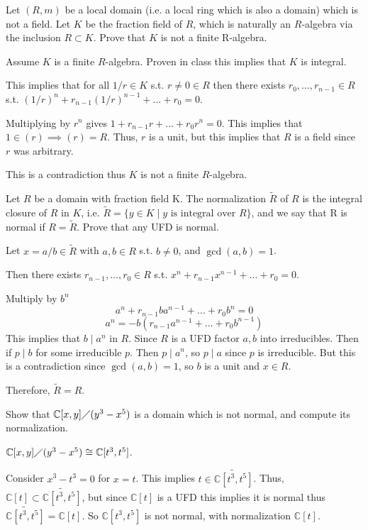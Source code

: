 \documentclass[12pt, letterpaper]{article}
\newcommand{\C}{\mathbb{C}}
\renewcommand{\t}[1]{\text{#1}}
\begin{document}

\begin{problem}{}
    Let $(R, m)$ be a local domain (i.e. a local ring which is also a domain) which is not a field.
Let $K$ be the fraction field of $R$, which is naturally an $R$-algebra via the inclusion $R \subset K$.
Prove that $K$ is not a finite R-algebra.
\end{problem}
\begin{problemproof}
    Assume $K$ is a finite $R$-algebra. Proven in class this implies that $K$ is integral.

    This implies that for all $1/r \in K$ s.t. $r \neq 0\in R$ then there exists $r_0,\dots,r_{n-1} \in R$ s.t. $(1/r)^n+r_{n-1}(1/r)^{n-1}+\dots+r_0=0$.

    Multiplying by $r^n$ gives $1+r_{n-1}r+\dots+r_0r^n=0$. This implies that $1 \in (r) \implies (r)=R$. Thus, $r$ is a unit, but this implies that $R$ is a field since $r$ was arbitrary.

    This is a contradiction thus $K$ is not a finite $R$-algebra.
\end{problemproof}

\begin{problem}{}
    Let $R$ be a domain with fraction field K. The normalization $\widetilde{R}$ of $R$ is the integral closure
of $R$ in $K$, i.e. $\widetilde{R} = \{y \in K \mid y \t{ is integral over } R\}$, and we say that R is normal if $R = \widetilde{R}$.
Prove that any UFD is normal.
\end{problem}
\begin{problemproof}
    Let $x = a/b \in \widetilde{R}$ with $a,b \in R$ s.t. $b \neq 0$, and $\gcd(a,b)=1$.

    Then there exists $r_{n-1},\dots,r_0 \in R$ s.t. $x^n+r_{n-1}x^{n-1}+\dots+r_0=0$.
    
    Multiply by $b^n$
    \[a^n+r_{n-1}ba^{n-1}+\dots+r_0b^n=0\]
    \[a^n=-b(r_{n-1}a^{n-1}+\dots+r_0b^{n-1})\]
    This implies that $b \mid a^n$ in $R$. Since $R$ is a UFD factor $a,b$ into irreducibles. Then if $p \mid b$ for some irreducible $p$. Then $p \mid a^n$, so $p \mid a$ since $p$ is irreducible. But this is a contradiction since $\gcd(a,b)=1$, so $b$ is a unit and $x \in R$.

    Therefore, $\widetilde{R} = R$.
\end{problemproof}

\qh
\begin{subproblem}{}
    Show that $\C[x,y] \diagup (y^3-x^5)$ is a domain which is not normal, and compute its normalization.
\end{subproblem}
\begin{problemproof}
    $\C[x,y] \diagup (y^3-x^5) \cong \C[t^3,t^5]$.

    Consider $x^3-t^3=0$ for $x=t$. This implies $t \in \widetilde{\C[t^3,t^5]}$. Thus, $\C[t] \subset \widetilde{\C[t^3,t^5]}$, but since $\C[t]$ is a UFD this implies it is normal thus $\widetilde{\C[t^3,t^5]}=\C[t]$. So $\C[t^3,t^5]$ is not normal, with normalization $\C[t]$.
\end{problemproof}
\end{document}
